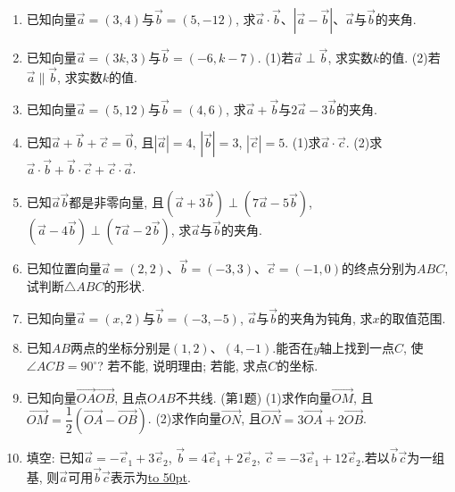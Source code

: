 \documentclass[10pt,a4paper]{article}
\newcommand{\blank}[1]{\underline{\hbox to #1pt{}}}
\begin{document}
\begin{enumerate}[1.]
\item 已知向量$\overrightarrow a=(3,4)$与$\overrightarrow b=(5,-12)$, 求$\overrightarrow a\cdot \overrightarrow b$、$|\overrightarrow a-\overrightarrow b|$、$\overrightarrow a$与$\overrightarrow b$的夹角.
\item 已知向量$\overrightarrow a=(3k,3)$与$\overrightarrow b=(-6,k-7)$.
(1)若$\overrightarrow a\perp \overrightarrow b$, 求实数$k$的值.
(2)若$\overrightarrow a\parallel \overrightarrow b$, 求实数$k$的值.
\item 已知向量$\overrightarrow a=(5,12)$与$\overrightarrow b=(4,6)$, 求$\overrightarrow a+\overrightarrow b$与$2\overrightarrow a-3\overrightarrow b$的夹角.
\item 已知$\overrightarrow a+\overrightarrow b+\overrightarrow c=\overrightarrow 0$, 且$|\overrightarrow a|=4$, $|\overrightarrow b|=3$, $|\overrightarrow c|=5$.
(1)求$\overrightarrow a\cdot \overrightarrow c$.
(2)求$\overrightarrow a\cdot \overrightarrow b+\overrightarrow b\cdot \overrightarrow c+\overrightarrow c\cdot \overrightarrow a$.
\item 已知$\overrightarrow a\overrightarrow b$都是非零向量, 且$(\overrightarrow a+3\overrightarrow b)\perp (7\overrightarrow a-5\overrightarrow b)$, $(\overrightarrow a-4\overrightarrow b)\perp (7\overrightarrow a-2\overrightarrow b)$, 求$\overrightarrow a$与$\overrightarrow b$的夹角.
\item 已知位置向量$\overrightarrow a=(2,2)$、$\overrightarrow b=(-3,3)$、$\overrightarrow c=(-1,0)$的终点分别为$ABC$, 试判断$\triangle ABC$的形状.
\item 已知向量$\overrightarrow a=(x,2)$与$\overrightarrow b=(-3,-5)$, $\overrightarrow a$与$\overrightarrow b$的夹角为钝角, 求$x$的取值范围.
\item 已知$AB$两点的坐标分别是$(1,2)$、$(4,-1)$.能否在$y$轴上找到一点$C$, 使$\angle ACB=90^{\circ }$? 若不能, 说明理由; 若能, 求点$C$的坐标.
\item 已知向量$\overrightarrow{OA}\overrightarrow{OB}$, 且点$OAB$不共线.
(第1题)
(1)求作向量$\overrightarrow{OM}$, 且$\overrightarrow{OM}=\dfrac 12(\overrightarrow{OA}-\overrightarrow{OB})$.
(2)求作向量$\overrightarrow{ON}$, 且$\overrightarrow{ON}=3\overrightarrow{OA}+2\overrightarrow{OB}$.
\item 填空:
已知$\overrightarrow a=-\overrightarrow e_1+3\overrightarrow e_2$, $\overrightarrow b=4\overrightarrow e_1+2\overrightarrow e_2$, $\overrightarrow c=-3\overrightarrow e_1+12\overrightarrow e_2$.若以$\overrightarrow b\overrightarrow c$为一组基, 则$\overrightarrow a$可用$\overrightarrow b\overrightarrow c$表示为\blank{50}.

\end{enumerate}
\end{document}
